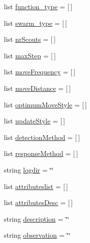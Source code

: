 \begin{CompactItemize}
\item 
list \hyperlink{classpsoParameter_1_1PsoParameter2_6e71bade23caa274c6cc7b066bfa28f4}{function\_\-type} = \mbox{[}$\,$\mbox{]}
\item 
list \hyperlink{classpsoParameter_1_1PsoParameter2_43c36b631d6d672302cb4044bb7f5158}{swarm\_\-type} = \mbox{[}$\,$\mbox{]}
\item 
list \hyperlink{classpsoParameter_1_1PsoParameter2_826c23debc8d84afb4d954981bff5a14}{nrScouts} = \mbox{[}$\,$\mbox{]}
\item 
list \hyperlink{classpsoParameter_1_1PsoParameter2_0ac03c9b69d4f2d114bcc893dc0fe0b7}{maxStep} = \mbox{[}$\,$\mbox{]}
\item 
list \hyperlink{classpsoParameter_1_1PsoParameter2_c8b945075c0e35683960291e37d17785}{moveFrequency} = \mbox{[}$\,$\mbox{]}
\item 
list \hyperlink{classpsoParameter_1_1PsoParameter2_5eeb7a2addc60823c2235f9450a2ae5b}{moveDistance} = \mbox{[}$\,$\mbox{]}
\item 
list \hyperlink{classpsoParameter_1_1PsoParameter2_d5aff72d14320c63729f4e7cf845afed}{optimumMoveStyle} = \mbox{[}$\,$\mbox{]}
\item 
list \hyperlink{classpsoParameter_1_1PsoParameter2_b8f05645deadf86d3b4883326b186005}{updateStyle} = \mbox{[}$\,$\mbox{]}
\item 
list \hyperlink{classpsoParameter_1_1PsoParameter2_c62654c7ce257a6c080f3af61ef00469}{detectionMethod} = \mbox{[}$\,$\mbox{]}
\item 
list \hyperlink{classpsoParameter_1_1PsoParameter2_3e66279c9494d5921555c43afc4b8d0e}{responseMethod} = \mbox{[}$\,$\mbox{]}
\item 
string \hyperlink{classpsoParameter_1_1PsoParameter2_3ad34822132a8168f976db076f4b0e52}{logdir} = \char`\"{}\char`\"{}
\item 
list \hyperlink{classpsoParameter_1_1PsoParameter2_3b44c43893335a323b95f491415c6e74}{attributeslist} = \mbox{[}$\,$\mbox{]}
\item 
list \hyperlink{classpsoParameter_1_1PsoParameter2_9fc3ad7196c6f1889a04bc0497597a57}{attributesDesc} = \mbox{[}$\,$\mbox{]}
\item 
string \hyperlink{classpsoParameter_1_1PsoParameter2_1fd69ffe7f2af8da6edfde6b755513b4}{description} = \char`\"{}\char`\"{}
\item 
string \hyperlink{classpsoParameter_1_1PsoParameter2_157d26e50adbd9cdf430b4bbc367f8c9}{observation} = \char`\"{}\char`\"{}
\end{CompactItemize}


